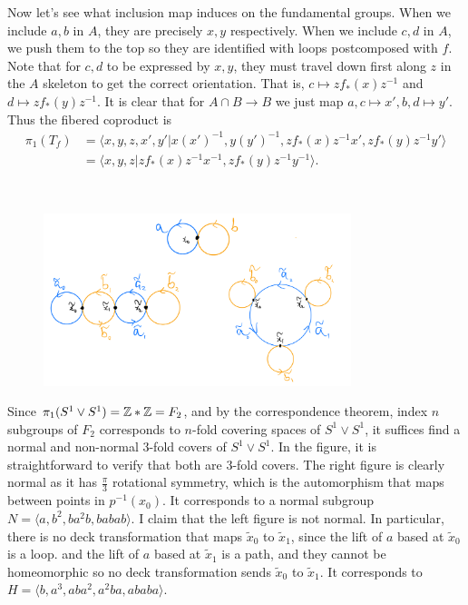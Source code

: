 \documentclass[12pt]{article}
\begin{document}
\begin{problem}[3]
Now let's see what inclusion map induces on the fundamental groups. When we include $ a,b$ in  $ A$, they are precisely $ x,y$ respectively. When we include  $ c,d$ in  $ A$, we push them to the top so they are identified with loops postcomposed with $f$. Note that for $ c,d$ to be expressed by $ x,y$, they must travel down first along  $ z$ in the $ A$ skeleton to get the correct orientation. That is, $ c \mapsto z f_*(x) z^{-1}$ and $ d \mapsto zf_*(y)z^{-1}$. It is clear that for $ A \cap B \to B$ we just map $ a,c \mapsto x',b,d\mapsto y'$. Thus the fibered coproduct is
\begin{align*}
	\pi_1( T_f) &= \langle x,y,z,x',y'|x(x')^{-1},y(y')^{-1},zf_*(x)z^{-1}x', zf_*(y)z^{-1}y' \rangle \\
	&= \langle x,y,z|zf_*(x)z^{-1}x^{-1}, zf_*(y)z^{-1}y^{-1} \rangle .
\end{align*}
\end{problem}

\begin{problem}[6]
~\begin{figure}[H]
	\centering
	\includegraphics[width=0.8\textwidth]{./figures/normal_cover.png}
	\caption{}
\end{figure}
Since $ \pi_1( S^{1} \vee S^{1}) = \mathbb{Z}*\mathbb{Z} =F_2$, and by the correspondence theorem, index $ n$ subgroups of $ F_2$ corresponds to $ n$-fold covering spaces of  $ S^{1} \vee S^{1}$, it suffices find a normal and non-normal 3-fold covers of $ S^{1} \vee S^{1}$. In the figure, it is straightforward to verify that both are 3-fold covers. The right figure is clearly normal as it has $ \frac{\pi}{ 3}$ rotational symmetry, which is the automorphism that maps between points in $ p^{-1}(x_0)$. It corresponds to a normal subgroup $ N = \langle a,b^2,ba^2b,babab \rangle$. I claim that the left figure is not normal. In particular, there is no deck transformation that maps $ \widetilde{ x}_0$ to $ \widetilde{ x}_1$, since the lift of $ a$ based at  $ \widetilde{ x}_0$ is a loop. and the lift of $ a$ based at  $ \widetilde{ x}_1$ is a path, and they cannot be homeomorphic so no deck transformation sends $ \widetilde{ x}_0$ to $ \widetilde{ x}_1$. It corresponds to $ H = \langle b,a^3,aba^2,a^2ba,ababa \rangle$.
\end{problem}
\end{document}
